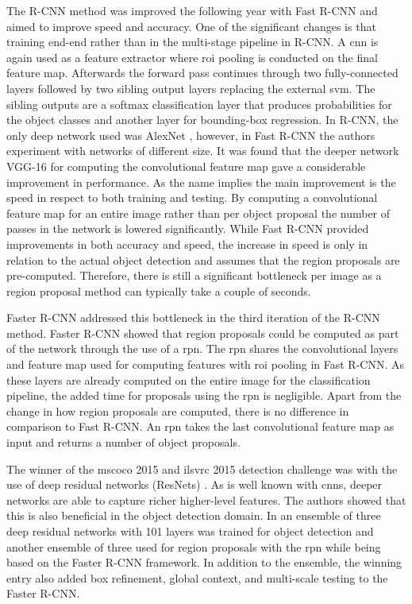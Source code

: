 \documentclass[a4paper,twoside]{article}
\begin{document}
The R-CNN method was improved the following year with Fast R-CNN \cite{fastrcnn} and aimed to improve speed and accuracy. One of the significant changes is that training end-end rather than in the multi-stage pipeline in R-CNN. A \gls{cnn} is again used as a feature extractor where \gls{roi} pooling is conducted on the final feature map. Afterwards the forward pass continues through two fully-connected layers followed by two sibling output layers replacing the external \gls{svm}. The sibling outputs are a softmax classification layer that produces probabilities for the object classes and another layer for bounding-box regression. In R-CNN, the only deep network used was AlexNet \cite{alexnet}, however, in Fast R-CNN the authors experiment with networks of different size. It was found that the deeper network VGG-16 \cite{vgg16} for computing the convolutional feature map gave a considerable improvement in performance. As the name implies the main improvement is the speed in respect to both training and testing. By computing a convolutional feature map for an entire image rather than per object proposal the number of passes in the network is lowered significantly. While Fast R-CNN provided improvements in both accuracy and speed, the increase in speed is only in relation to the actual object detection and assumes that the region proposals are pre-computed. Therefore, there is still a significant bottleneck per image as a region proposal method can typically take a couple of seconds. 

Faster R-CNN \cite{fasterrcnn} addressed this bottleneck in the third iteration of the R-CNN method. Faster R-CNN showed that region proposals could be computed as part of the network through the use of a \gls{rpn}. The \gls{rpn} shares the convolutional layers and feature map used for computing features with \gls{roi} pooling in Fast R-CNN. As these layers are already computed on the entire image for the classification pipeline, the added time for proposals using the \gls{rpn} is negligible. Apart from the change in how region proposals are computed, there is no difference in comparison to Fast R-CNN. An \gls{rpn} takes the last convolutional feature map as input and returns a number of object proposals.

The winner of the \gls{mscoco} 2015 and \gls{ilsvrc} 2015 detection challenge was with the use of deep residual networks (ResNets) \cite{deepres}. As is well known with \glspl{cnn}, deeper networks are able to capture richer higher-level features. The authors showed that this is also beneficial in the object detection domain. In \cite{deepres} an ensemble of three deep residual networks with 101 layers was trained for object detection and another ensemble of three used for region proposals with the \gls{rpn} while being based on the Faster R-CNN framework. In addition to the ensemble, the winning entry also added box refinement, global context, and multi-scale testing to the Faster R-CNN.
\end{document}
